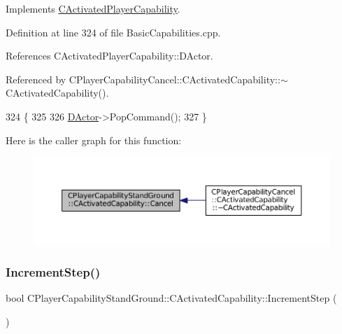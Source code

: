 Implements \hyperlink{classCActivatedPlayerCapability_a5cde83be468e262ad054d81e28684a81}{C\+Activated\+Player\+Capability}.



Definition at line 324 of file Basic\+Capabilities.\+cpp.



References C\+Activated\+Player\+Capability\+::\+D\+Actor.



Referenced by C\+Player\+Capability\+Cancel\+::\+C\+Activated\+Capability\+::$\sim$\+C\+Activated\+Capability().


\begin{DoxyCode}
324                                                              \{
325 
326     \hyperlink{classCActivatedPlayerCapability_a54ca944b47bff2718330639941d402b0}{DActor}->PopCommand();
327 \}
\end{DoxyCode}
Here is the caller graph for this function\+:\nopagebreak
\begin{figure}[H]
\begin{center}
\leavevmode
\includegraphics[width=350pt]{classCPlayerCapabilityStandGround_1_1CActivatedCapability_ac75cd8a26726adb60cf045f99059ca7d_icgraph}
\end{center}
\end{figure}
\hypertarget{classCPlayerCapabilityStandGround_1_1CActivatedCapability_ab4061171835e4c1008176e5765ded595}{}\label{classCPlayerCapabilityStandGround_1_1CActivatedCapability_ab4061171835e4c1008176e5765ded595} 
\subsubsection{\texorpdfstring{Increment\+Step()}{IncrementStep()}}
{\footnotesize\ttfamily bool C\+Player\+Capability\+Stand\+Ground\+::\+C\+Activated\+Capability\+::\+Increment\+Step (\begin{DoxyParamCaption}{ }\end{DoxyParamCaption})\hspace{0.3cm}{\ttfamily [virtual]}}



